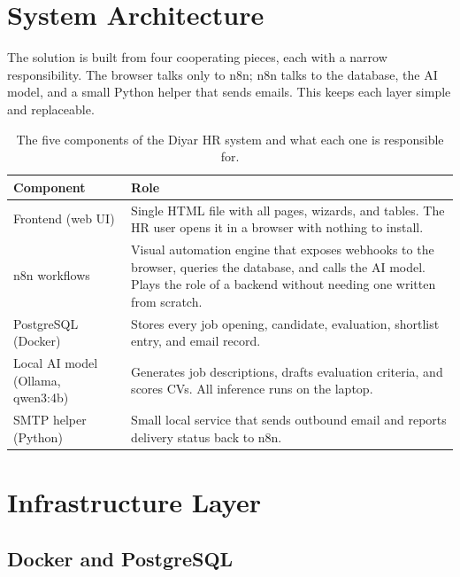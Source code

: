 \documentclass[12pt]{article}
\begin{document}
\section{System Architecture}

The solution is built from four cooperating pieces, each with a narrow responsibility. The browser talks only to n8n; n8n talks to the database, the AI model, and a small Python helper that sends emails. This keeps each layer simple and replaceable.

\begin{table}[H]
    \centering
    \begin{tabular}{|p{4.2cm}|p{10cm}|}
        \hline
        \textbf{Component} & \textbf{Role} \\
        \hline
        Frontend (web UI) & Single HTML file with all pages, wizards, and tables. The HR user opens it in a browser with nothing to install. \\
        \hline
        n8n workflows & Visual automation engine that exposes webhooks to the browser, queries the database, and calls the AI model. Plays the role of a backend without needing one written from scratch. \\
        \hline
        PostgreSQL (Docker) & Stores every job opening, candidate, evaluation, shortlist entry, and email record. \\
        \hline
        Local AI model (Ollama, qwen3:4b) & Generates job descriptions, drafts evaluation criteria, and scores CVs. All inference runs on the laptop. \\
        \hline
        SMTP helper (Python) & Small local service that sends outbound email and reports delivery status back to n8n. \\
        \hline
    \end{tabular}
    \caption{The five components of the Diyar HR system and what each one is responsible for.}
\end{table}

\section{Infrastructure Layer}

\subsection{Docker and PostgreSQL}
\end{document}
